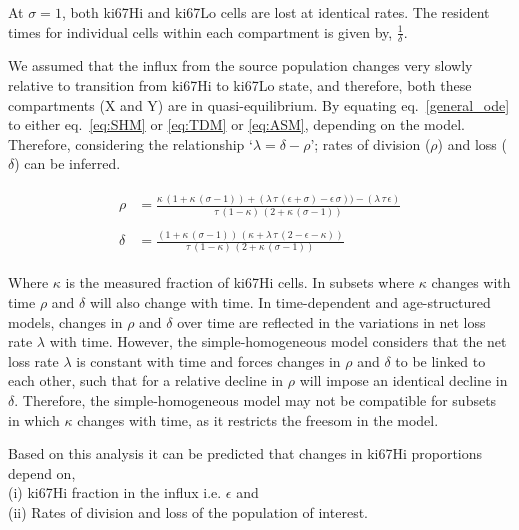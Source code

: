\documentclass[11pt]{article}
\newcommand{\bea}{\begin{eqnarray}}
\newcommand{\eea}{\end{eqnarray}}
\begin{document}
At $\sigma =1$, both ki67Hi and ki67Lo cells are lost at identical rates.
The resident times for individual cells within each compartment is given by, $\frac{1}{\delta}$.


We assumed that the influx from the source population changes very slowly relative to transition from ki67Hi to ki67Lo state, and therefore, both these compartments (X and Y) are in quasi-equilibrium. By equating eq.~\ref{general_ode} to either eq.~\ref{eq:SHM} or \ref{eq:TDM} or \ref{eq:ASM}, depending on the model. Therefore, considering the relationship `$\lambda = \delta - \rho$'; rates of division ($\rho$) and loss ($\delta$) can be inferred.


\bea
\begin{aligned}
\rho &= \frac{\kappa \, (1+ \kappa \, (\sigma -1)) + (\lambda \, \tau \, (\epsilon + \sigma) - \epsilon \, \sigma)) - (\lambda \, \tau \, \epsilon)}{\tau \, (1-\kappa) \, (2 + \kappa \, (\sigma -1))}\\
\\
\delta &= \frac{(1+\kappa \, (\sigma -1)) \, (\kappa + \lambda \, \tau \,(2-\epsilon - \kappa))}{\tau \, (1-\kappa) \, (2+\kappa \, (\sigma - 1))}
\end{aligned}
\label{rho_delta}
\eea

Where $\kappa$ is the measured fraction of ki67Hi cells. In subsets where $\kappa$ changes with time $\rho$ and $\delta$ will also change with time.
In time-dependent and age-structured models, changes in $\rho$ and $\delta$ over time are reflected in the variations in net loss rate $\lambda$ with time. 
However, the simple-homogeneous model considers that the net loss rate $\lambda$ is constant with time and forces changes in $\rho$ and $\delta$ to be linked to each other, such that for a relative decline in $\rho$ will impose an identical decline in $\delta$. Therefore, the simple-homogeneous model may not be compatible for subsets in which $\kappa$ changes with time, as it restricts the freesom in the model.


Based on this analysis it can be predicted that changes in ki67Hi proportions depend on, \\
(i) ki67Hi fraction in the influx i.e. $\epsilon$ and \\
(ii) Rates of division and loss of the population of interest. 
\end{document}
